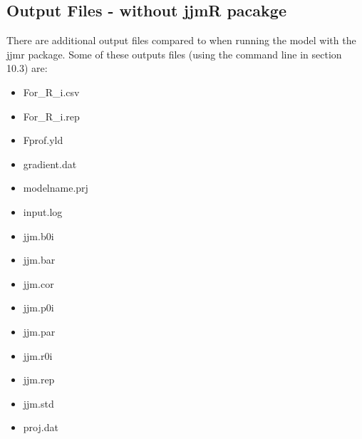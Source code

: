 \documentclass{article}
\begin{document}
\subsection{Output Files - without jjmR pacakge}
There are additional output files compared to when running the model with the jjmr package. Some of these outputs files (using the command line in section 10.3) are:
\begin{itemize}
    \item For\_R\_i.csv
    \item For\_R\_i.rep
    \item Fprof.yld
    \item gradient.dat
    \item modelname.prj
    \item input.log
    \item jjm.b0i
    \item jjm.bar
    \item jjm.cor
    \item jjm.p0i
    \item jjm.par
    \item jjm.r0i
    \item jjm.rep
    \item jjm.std
    \item proj.dat
\end{itemize}
\end{document}
